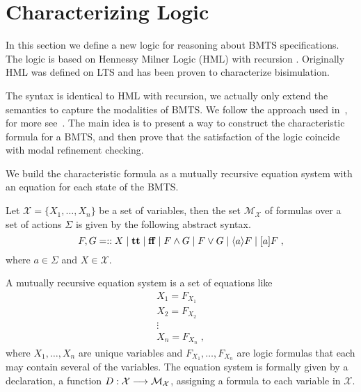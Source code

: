\section{Characterizing Logic}
In this section we define a new logic for reasoning about BMTS specifications. The logic is based on Hennessy Milner Logic (HML) with recursion \cite{DBLP:conf/caap/Larsen88}. Originally \cite{DBLP:journals/jacm/HennessyM85} HML was defined on LTS and has been proven to characterize bisimulation. 

The syntax is identical to HML with recursion, we actually only extend the semantics to capture the modalities of BMTS. We follow the approach used in~\cite{DBLP:journals/iandc/SteffenI94}, for more see~\cite{AILS:reactive:07}. 
The main idea is to present a way to construct the characteristic formula for a BMTS, and then prove that the satisfaction of the logic coincide with modal refinement checking.

We build the characteristic formula as a mutually recursive equation system with an equation for each state of the BMTS.

Let $\mathcal{X} = \{X_1,\ldots,X_n\}$ be a set of variables, then the set $\mathcal{M_X}$ of formulas over a set of actions $\Sigma$ is given by the following abstract syntax.
\[
 F,G =:: 	X \mid
			\mathbf{tt} \mid 
			\mathbf{ff} \mid 
			F \wedge G \mid 
			F \vee G \mid 
			\langle a \rangle F \mid
			[a] F\; ,
\]
where $a \in \Sigma$ and $X \in \mathcal{X}$.

A mutually recursive equation system is a set of equations like 
\begin{align*}
	X_1=F_{X_1} \\
	X_2=F_{X_2} \\
	\vdots \\
 	X_n=F_{X_n}\;,
\end{align*}	
where $X_1, \ldots, X_n$ are unique variables and $F_{X_1},\ldots, F_{X_n}$ are logic formulas that each may contain several of the variables. The equation system is formally given by a declaration, a function $D: \mathcal{X} \stackrel{}{\longrightarrow} \mathcal{M_X}$, assigning a formula to each variable in $\mathcal{X}$.

